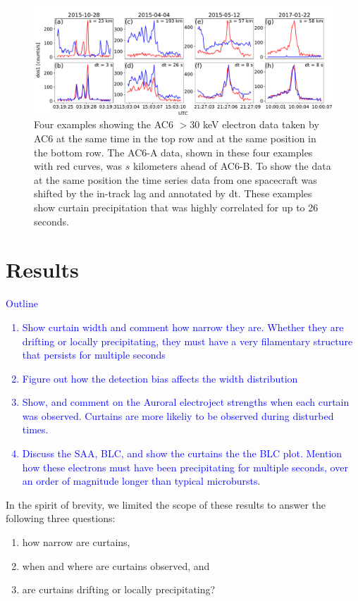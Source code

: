 \documentclass[draft]{agujournal2019}
\begin{document}
\begin{figure}
\includegraphics[width=\textwidth]{fig1.pdf}
\caption{Four examples showing the AC6 $> 30$ keV electron data taken by AC6 at the same time in the top row and at the same position in the bottom row. The AC6-A data, shown in these four examples with red curves, was $s$ kilometers ahead of AC6-B. To show the data at the same position the time series data from one spacecraft was shifted by the in-track lag and annotated by dt. These examples show curtain precipitation that was highly correlated for up to 26 seconds.}
\label{fig1}
\end{figure}

\section{Results} \label{results}
\textcolor{blue}{
Outline
\begin{enumerate}
\item Show curtain width and comment how narrow they are. Whether they are drifting or locally precipitating, they must have a very filamentary structure that persists for multiple seconds
\item Figure out how the detection bias affects the width distribution
\item Show, and comment on the Auroral electroject strengths when each curtain was observed. Curtains are more likeliy to be observed during disturbed times.
\item Discuss the SAA, BLC, and show the curtains the the BLC plot. Mention how these electrons must have been precipitating for multiple seconds, over an order of magnitude longer than typical microbursts.
\end{enumerate}
}

In the spirit of brevity, we limited the scope of these results to answer the following three questions:

\begin{enumerate}
\item how narrow are curtains,
\item when and where are curtains observed, and
\item are curtains drifting or locally precipitating?
\end{enumerate}
\end{document}
